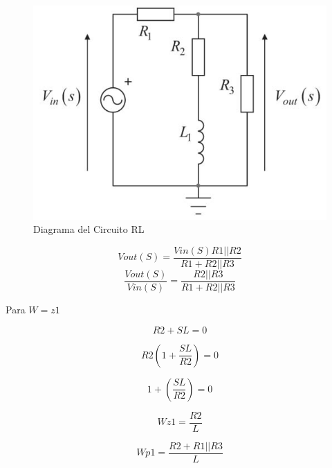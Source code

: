 \documentclass[letterpaper,10pt]{article}
\begin{document}
    \vspace*{0.2in}
    \begin{figure}[h!]
    	\centering
    	\includegraphics[scale=0.4]{CIRCUITORL}
    	\caption{Diagrama del Circuito RL}
    \end{figure}
    
     \begin{equation}
       Vout(S) = \frac{Vin(S)R1||R2}{R1+R2||R3}
    \end{equation}
     \begin{equation}
    \frac{Vout(S)}{Vin(S)} = \frac{R2||R3}{R1+R2||R3}
    \end{equation}
   
    
    
    Para $W = z1$
    

	\begin{equation}
		R2 + SL = 0
	\end{equation}
    
    \begin{equation}
    R2 ( 1 + \frac{SL}{R2}) = 0
    \end{equation}
    
     \begin{equation}
    1 + (\frac{SL}{R2})=0
    \end{equation}
    
     \begin{equation}
    Wz1 = \frac{R2}{L}
    \end{equation}
    
     \begin{equation}
    Wp1 = \frac{R2+R1||R3}{L}
    \end{equation}
    
\end{document}
